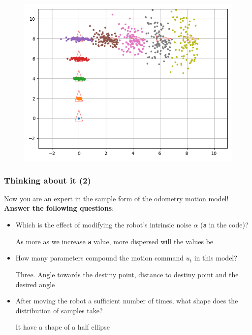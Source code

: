 \documentclass[11pt]{article}
\begin{document}
\begin{figure}
\centering
\includegraphics{returns/332.PNG}
\end{figure}    

    \hypertarget{thinking-about-it-2}{%
\subsubsection{Thinking about it (2)}\label{thinking-about-it-2}}

Now you are an expert in the sample form of the odometry motion model!
\textbf{Answer the following questions}:

\begin{itemize}
\item
  Which is the effect of modifying the robot's intrinsic noise
  \(\alpha\) (\texttt{a} in the code)?

  As more as we increase \texttt{a} value, more dispersed will the
  values be
\item
  How many parameters compound the motion command \(u_t\) in this model?

  Three. Angle towards the destiny point, distance to destiny point and
  the desired angle
\item
  After moving the robot a sufficient number of times, what shape does
  the distribution of samples take?

  It have a shape of a half ellipse
\end{itemize}


    
    
    
\end{document}
